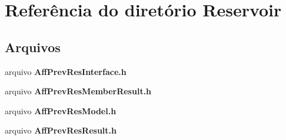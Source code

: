 \section{Referência do diretório Reservoir}
\label{dir_fda49dd6e3cbcb322094ae3cdbbbc498}
\subsection*{Arquivos}
\begin{DoxyCompactItemize}
\item 
arquivo {\bf Aff\+Prev\+Res\+Interface.\+h}
\item 
arquivo {\bf Aff\+Prev\+Res\+Member\+Result.\+h}
\item 
arquivo {\bf Aff\+Prev\+Res\+Model.\+h}
\item 
arquivo {\bf Aff\+Prev\+Res\+Result.\+h}
\end{DoxyCompactItemize}
